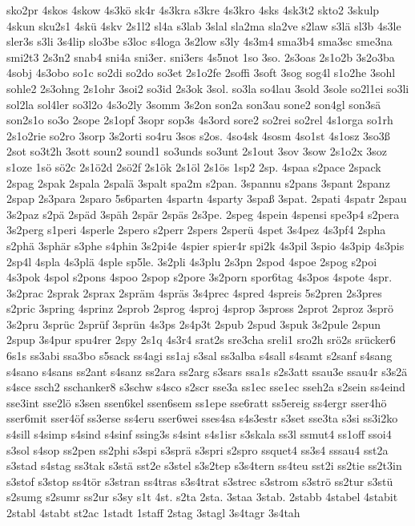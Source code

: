 {sko2pr
4skos
4skow
4s3kö
sk4r
4s3kra
s3kre
4s3kro
4sks
4sk3t2
skto2
3skulp
4skun
sku2s1
4skü
4skv
2s1l2
sl4a
s3lab
3slal
sla2ma
sla2ve
s2law
s3lä
sl3b
4s3le
sler3s
s3li
3s4lip
slo3be
s3loc
s4loga
3s2low
s3ly
4s3m4
sma3b4
sma3sc
sme3na
smi2t3
2s3n2
snab4
sni4a
sni3er.
sni3ers
4s5not
1so
3so.
2s3oas
2s1o2b
3s2o3ba
4sobj
4s3obo
so1c
so2di
so2do
so3et
2s1o2fe
2soffi
3soft
3sog
sog4l
s1o2he
3sohl
sohle2
2s3ohng
2s1ohr
3soi2
so3id
2s3ok
3sol.
so3la
so4lau
3sold
3sole
so2l1ei
so3li
sol2la
sol4ler
so3l2o
4s3o2ly
3somm
3s2on
son2a
son3au
sone2
son4gl
son3sä
son2s1o
so3o
2sope
2s1opf
3sopr
sop3s
4s3ord
sore2
so2rei
so2rel
4s1orga
so1rh
2s1o2rie
so2ro
3sorp
3s2orti
so4ru
3sos
s2os.
4so4sk
4sosm
4so1st
4s1osz
3so3ß
2sot
so3t2h
3sott
soun2
sound1
so3unds
so3unt
2s1out
3sov
3sow
2s1o2x
3soz
s1oze
1sö
sö2c
2s1ö2d
2sö2f
2s1ök
2s1öl
2s1ös
1sp2
2sp.
4spaa
s2pace
2spack
2spag
2spak
2spala
2spalä
3spalt
spa2m
s2pan.
3spannu
s2pans
3spant
2spanz
2spap
2s3para
2sparo
5s6parten
4spartn
4sparty
3spaß
3spat.
2spati
4spatr
2spau
3s2paz
s2pä
2späd
3späh
2spär
2späs
2s3pe.
2speg
4spein
4spensi
spe3p4
s2pera
3s2perg
s1peri
4sperle
2spero
s2perr
2spers
2sperü
4spet
3s4pez
4s3pf4
2spha
s2phä
3sphär
s3phe
s4phin
3s2pi4e
4spier
spier4r
spi2k
4s3pil
3spio
4s3pip
4s3pis
2sp4l
4spla
4s3plä
4sple
sp5le.
3s2pli
4s3plu
2s3pn
2spod
4spoe
2spog
s2poi
4s3pok
4spol
s2pons
4spoo
2spop
s2pore
3s2porn
spor6tag
4s3pos
4spote
4spr.
3s2prac
2sprak
2sprax
2spräm
4spräs
3s4prec
4spred
4spreis
5s2pren
2s3pres
s2pric
3spring
4sprinz
2sprob
2sprog
4sproj
4sprop
3spross
2sprot
2sproz
3sprö
3s2pru
3sprüc
2sprüf
3sprün
4s3ps
2s4p3t
2spub
2spud
3spuk
3s2pule
2spun
2spup
3s4pur
spu4rer
2spy
2s1q
4s3r4
srat2s
sre3cha
sreli1
sro2h
srö2s
srücker6
6s1s
ss3abi
ssa3bo
s5sack
ss4agi
ss1aj
s3sal
ss3alba
s4sall
s4samt
s2sanf
s4sang
s4sano
s4sans
ss2ant
s4sanz
ss2ara
ss2arg
s3sars
ssa1s
s2s3att
ssau3e
ssau4r
s3s2ä
s4sce
ssch2
sschanker8
s3schw
s4sco
s2scr
sse3a
ss1ec
sse1ec
sseh2a
s2sein
ss4eind
sse3int
sse2lö
s3sen
ssen6kel
ssen6sem
ss1epe
sse6ratt
ss5ereig
ss4ergr
sser4hö
sser6mit
sser4öf
ss3erse
ss4eru
sser6wei
sses4sa
s4s3estr
s3set
sse3ta
s3si
ss3i2ko
s4sill
s4simp
s4sind
s4sinf
ssing3s
s4sint
s4s1isr
s3skala
ss3l
ssmut4
ss1off
ssoi4
s3sol
s4sop
ss2pen
ss2phi
s3spi
s3sprä
s3spri
s2spro
ssquet4
ss3s4
sssau4
sst2a
s3stad
s4stag
ss3tak
s3stä
sst2e
s3stel
s3s2tep
s3s4tern
ss4teu
sst2i
ss2tie
ss2t3in
s3stof
s3stop
ss4tör
s3stran
ss4tras
s3s4trat
s3strec
s3strom
s3strö
ss2tur
s3stü
s2sumg
s2sumr
ss2ur
s3sy
s1t
4st.
s2ta
2sta.
3staa
3stab.
2stabb
4stabel
4stabit
2stabl
4stabt
st2ac
1stadt
1staff
2stag
3stagl
3s4tagr
3s4tah
}
